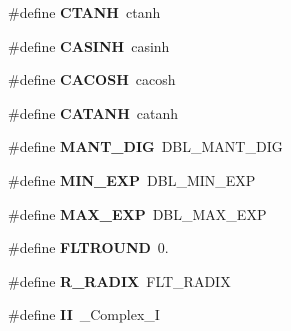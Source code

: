 \begin{DoxyCompactItemize}
\item 
\hypertarget{group__nfftutil_ga8ed8778716fcef81b690bea364421cac}{\#define {\bfseries C\-T\-A\-N\-H}~ctanh}\label{group__nfftutil_ga8ed8778716fcef81b690bea364421cac}

\item 
\hypertarget{group__nfftutil_ga06befc83ce9626b64bdec75d27bf4201}{\#define {\bfseries C\-A\-S\-I\-N\-H}~casinh}\label{group__nfftutil_ga06befc83ce9626b64bdec75d27bf4201}

\item 
\hypertarget{group__nfftutil_ga6c24f714a1fc6974019c72b16f9c444c}{\#define {\bfseries C\-A\-C\-O\-S\-H}~cacosh}\label{group__nfftutil_ga6c24f714a1fc6974019c72b16f9c444c}

\item 
\hypertarget{group__nfftutil_ga32c0019bc4667b161f1d15834de4e52e}{\#define {\bfseries C\-A\-T\-A\-N\-H}~catanh}\label{group__nfftutil_ga32c0019bc4667b161f1d15834de4e52e}

\item 
\hypertarget{group__nfftutil_ga4691b3501d88346ba5d89ed12ecc7433}{\#define {\bfseries M\-A\-N\-T\-\_\-\-D\-I\-G}~D\-B\-L\-\_\-\-M\-A\-N\-T\-\_\-\-D\-I\-G}\label{group__nfftutil_ga4691b3501d88346ba5d89ed12ecc7433}

\item 
\hypertarget{group__nfftutil_ga7df7879b8a01f36b50c36c526d20e81e}{\#define {\bfseries M\-I\-N\-\_\-\-E\-X\-P}~D\-B\-L\-\_\-\-M\-I\-N\-\_\-\-E\-X\-P}\label{group__nfftutil_ga7df7879b8a01f36b50c36c526d20e81e}

\item 
\hypertarget{group__nfftutil_gaca29a1e29b43877403defc1a4dbce1cc}{\#define {\bfseries M\-A\-X\-\_\-\-E\-X\-P}~D\-B\-L\-\_\-\-M\-A\-X\-\_\-\-E\-X\-P}\label{group__nfftutil_gaca29a1e29b43877403defc1a4dbce1cc}

\item 
\hypertarget{group__nfftutil_gae29f9fbc7c7d52e42d3d09c2ea31c874}{\#define {\bfseries F\-L\-T\-R\-O\-U\-N\-D}~0.}\label{group__nfftutil_gae29f9fbc7c7d52e42d3d09c2ea31c874}

\item 
\hypertarget{group__nfftutil_ga574077f343f01348134a92c3d9a036ca}{\#define {\bfseries R\-\_\-\-R\-A\-D\-I\-X}~F\-L\-T\-\_\-\-R\-A\-D\-I\-X}\label{group__nfftutil_ga574077f343f01348134a92c3d9a036ca}

\item 
\hypertarget{group__nfftutil_gaae5a7261e9977d666462304e9063ce0e}{\#define {\bfseries I\-I}~\-\_\-\-Complex\-\_\-\-I}\label{group__nfftutil_gaae5a7261e9977d666462304e9063ce0e}


\end{DoxyCompactItemize}
